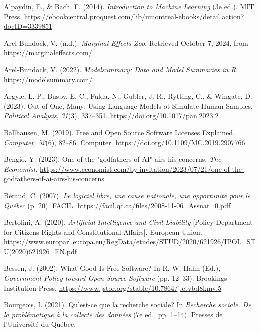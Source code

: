 \documentclass[
  letterpaper,
  DIV=11,
  numbers=noendperiod]{scrreprt}
\newlength{\cslhangindent}
\newenvironment{CSLReferences}[2] %
 {\begin{list}{}{%
  \setlength{\itemindent}{0pt}
  \setlength{\leftmargin}{0pt}
  \setlength{\parsep}{0pt}
  \ifodd #1
   \setlength{\leftmargin}{\cslhangindent}
   \setlength{\itemindent}{-1\cslhangindent}
  \fi
  \setlength{\itemsep}{#2\baselineskip}}}
 {\end{list}}
\begin{document}
\label{refs}
\begin{CSLReferences}{1}{0}
Alpaydin, E., \& Bach, F. (2014). \emph{Introduction to {Machine
Learning}} (3e ed.). MIT Press.
\url{https://ebookcentral.proquest.com/lib/umontreal-ebooks/detail.action?docID=3339851}

Arel-Bundock, V. (n.d.). \emph{Marginal {Effects Zoo}}. Retrieved
October 7, 2024, from \url{https://marginaleffects.com/}

Arel-Bundock, V. (2022). \emph{Modelsummary: {Data} and {Model
Summaries} in {R}}. \url{https://modelsummary.com/}

Argyle, L. P., Busby, E. C., Fulda, N., Gubler, J. R., Rytting, C., \&
Wingate, D. (2023). Out of {One}, {Many}: {Using Language Models} ot
{Simulate Human Samples}. \emph{Political Analysis}, \emph{31}(3),
337--351. \url{https://doi.org/10.1017/pan.2023.2}

Ballhausen, M. (2019). Free and {Open Source Software Licenses
Explained}. \emph{Computer}, \emph{52}(6), 82--86. Computer.
\url{https://doi.org/10.1109/MC.2019.2907766}

Bengio, Y. (2023). One of the "godfathers of {AI}" airs his concerns.
\emph{The Economist}.
\url{https://www.economist.com/by-invitation/2023/07/21/one-of-the-godfathers-of-ai-airs-his-concerns}

Béraud, C. (2007). \emph{Le logiciel libre, une cause nationale, une
opportunité pour le {Québec}} (p. 20). FACIL.
\url{https://facil.qc.ca/files/2008-11-06_Assnat_0.pdf}

Bertolini, A. (2020). \emph{Artificial {Intelligence} and {Civil
Liability}} {[}Policy Department for Citizen\textquotesingle s Rights
and Constitutional Affairs{]}. European Union.
\url{https://www.europarl.europa.eu/RegData/etudes/STUD/2020/621926/IPOL_STU(2020)621926_EN.pdf}

Bessen, J. (2002). What {Good Is Free Software}? In R. W. Hahn (Ed.),
\emph{Government {Policy} toward {Open Source Software}} (pp. 12--33).
Brookings Institution Press.
\url{https://www.jstor.org/stable/10.7864/j.ctvbd8kmv.5}

Bourgeois, I. (2021). Qu'est-ce que la recherche sociale? In
\emph{Recherche sociale. {De} la problématique à la collecte des
données} (7e ed., pp. 1--14). Presses de l'Université du Québec.


\end{CSLReferences}
\end{document}
